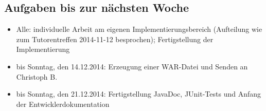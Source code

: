 \documentclass[12pt,a4paper]{article}
\begin{document}
\subsection*{Aufgaben bis zur nächsten Woche}
\medskip
\begin{itemize}
\item Alle: individuelle Arbeit am eigenen Implementierungsbereich (Aufteilung wie zum Tutorentreffen 2014-11-12 besprochen); Fertigstellung der Implementierung
\item bis Sonntag, den 14.12.2014: Erzeugung einer WAR-Datei und Senden an Christoph B.
\item bis Sonntag, den 21.12.2014: Fertigstellung JavaDoc, JUnit-Tests und Anfang der Entwicklerdokumentation
\end{itemize}
\end{document}
